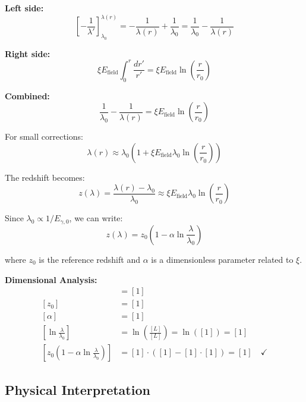\documentclass[12pt,a4paper]{report}
\begin{document}
\textbf{Left side:}
\begin{equation}
	\left[-\frac{1}{\lambda'}\right]_{\lambda_0}^{\lambda(r)} = -\frac{1}{\lambda(r)} + \frac{1}{\lambda_0} = \frac{1}{\lambda_0} - \frac{1}{\lambda(r)}
\end{equation}

\textbf{Right side:}
\begin{equation}
	\xi E_{\text{field}} \int_0^r \frac{dr'}{r'} = \xi E_{\text{field}} \ln\left(\frac{r}{r_0}\right)
\end{equation}

\textbf{Combined:}
\begin{equation}
	\frac{1}{\lambda_0} - \frac{1}{\lambda(r)} = \xi E_{\text{field}} \ln\left(\frac{r}{r_0}\right)
\end{equation}

For small corrections:
\begin{equation}
	\lambda(r) \approx \lambda_0 \left(1 + \xi E_{\text{field}} \lambda_0 \ln\left(\frac{r}{r_0}\right)\right)
\end{equation}

The redshift becomes:
\begin{equation}
	z(\lambda) = \frac{\lambda(r) - \lambda_0}{\lambda_0} \approx \xi E_{\text{field}} \lambda_0 \ln\left(\frac{r}{r_0}\right)
\end{equation}

Since $\lambda_0 \propto 1/E_{\gamma,0}$, we can write:
\begin{equation}
	\boxed{z(\lambda) = z_0\left(1 - \alpha \ln\frac{\lambda}{\lambda_0}\right)}
	\label{eq:wavelength_dependent_redshift}
\end{equation}

where $z_0$ is the reference redshift and $\alpha$ is a dimensionless parameter related to $\xi$.

\textbf{Dimensional Analysis:}
\begin{align}
	[z(\lambda)] &= [1] \\
	[z_0] &= [1] \\
	[\alpha] &= [1] \\
	\left[\ln\frac{\lambda}{\lambda_0}\right] &= \ln\left(\frac{[L]}{[L]}\right) = \ln([1]) = [1] \\
	\left[z_0\left(1 - \alpha \ln\frac{\lambda}{\lambda_0}\right)\right] &= [1] \cdot ([1] - [1] \cdot [1]) = [1] \quad \checkmark
\end{align}

	\subsection{Physical Interpretation}
	\label{subsec:physical_interpretation_redshift}
	
\end{document}
